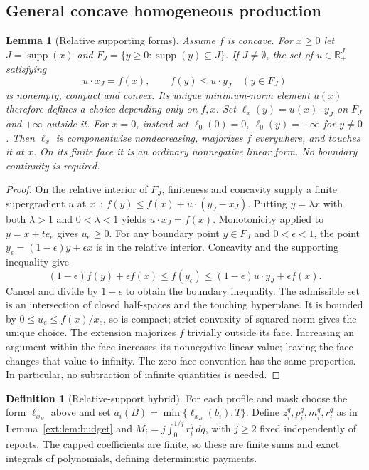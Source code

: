 \documentclass[11pt]{article}
\newtheorem{lemma}[theorem]{Lemma}
\theoremstyle{definition}\newtheorem{definition}[theorem]{Definition}
\theoremstyle{remark}\newtheorem{remark}[theorem]{Remark}
\newcommand{\R}{\mathbb R}
\begin{document}
\subsection{General concave homogeneous production}
\begin{lemma}[Relative supporting forms]\label{ext:lem:support}
Assume $f$ is concave.  For $x\ge0$ let $J=\operatorname{supp}(x)$ and
$F_J=\{y\ge0:\operatorname{supp}(y)\subseteq J\}$.
If $J\ne\emptyset$, the set of $u\in\R_+^J$ satisfying
\[
 u\cdot x_J=f(x),\qquad f(y)\le u\cdot y_J\quad(y\in F_J)
\]
is nonempty, compact and convex.  Its unique minimum-norm element $u(x)$
therefore defines a choice depending only on $f,x$.
Set $\ell_x(y)=u(x)\cdot y_J$ on $F_J$ and $+\infty$ outside it.
For $x=0$, instead set $\ell_0(0)=0$, $\ell_0(y)=+\infty$ for $y\ne0$.
Then $\ell_x$ is componentwise nondecreasing, majorizes $f$ everywhere,
and touches it at $x$.  On its finite face it is an ordinary nonnegative
linear form.  No boundary continuity is required.
\end{lemma}
\begin{proof}
On the relative interior of $F_J$, finiteness and concavity supply a finite
supergradient $u$ at $x$~\cite{BoydSubgradients}:
$f(y)\le f(x)+u\cdot(y_J-x_J)$.
Putting $y=\lambda x$ with both $\lambda>1$ and $0<\lambda<1$ yields
$u\cdot x_J=f(x)$.  Monotonicity applied to $y=x+te_e$ gives $u_e\ge0$.
For any boundary point $y\in F_J$ and $0<\epsilon<1$, the point
$y_\epsilon=(1-\epsilon)y+\epsilon x$ is in the relative interior.
Concavity and the supporting inequality give
\[
 (1-\epsilon)f(y)+\epsilon f(x)\le f(y_\epsilon)
 \le(1-\epsilon)u\cdot y_J+\epsilon f(x).
\]
Cancel and divide by $1-\epsilon$ to obtain the boundary inequality.
The admissible set is an intersection of closed half-spaces and the touching
hyperplane.  It is bounded by $0\le u_e\le f(x)/x_e$, so is compact;
strict convexity of squared norm gives the unique choice.
The extension majorizes $f$ trivially outside its face.  Increasing an argument
within the face increases its nonnegative linear value; leaving the face
changes that value to infinity.  The zero-face convention has the same
properties.  In particular, no subtraction of infinite quantities is needed.
\end{proof}

\begin{definition}[Relative-support hybrid]\label{ext:def:general}
For each profile and mask choose the form $\ell_{x_B}$ above and set
$a_i(B)=\min\{\ell_{x_B}(b_i),T\}$.
Define $z_i^q,p_i^q,m_i^q,r_i^q$ as in Lemma~\ref{ext:lem:budget} and
$M_i=j\int_0^{1/j}r_i^q\,dq$, with $j\ge2$ fixed independently of reports.
The capped coefficients are finite, so these are finite sums and exact
integrals of polynomials, defining deterministic payments.
\end{definition}
\end{document}
